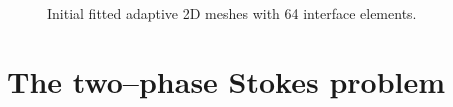 \documentclass[a4paper,12pt,onecolumn]{article}
\begin{document}
\begin{figure}[htbp]
  \centering
  \quad
  \\
  \caption{Initial fitted adaptive 2D meshes with 64 interface elements.}
  \label{fig:meshes_adaptive}
\end{figure}

\section{The two--phase Stokes problem}\label{sec:problem}
\end{document}
